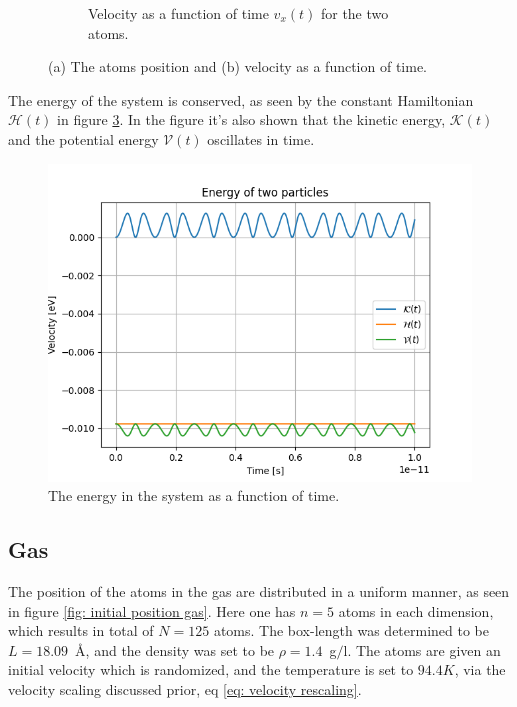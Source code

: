 \documentclass[a4paper]{article}
\begin{document}
\begin{figure}[H]
\begin{subfigure}[b]{0.45\textwidth}
        \caption{Velocity as a function of time $v_x(t)$ for the two atoms.}
        \label{fig: Velocity BT}
    \end{subfigure}
    \caption{(a) The atoms position and (b) velocity as a function of time.}
    \label{fig: Position & Velocity Bouncing test}
\end{figure}\noindent
The energy of the system is conserved, as seen by the constant Hamiltonian $\mathcal{H}(t)$ in figure \ref{fig: Energy Bouncing test}.
In the figure it's also shown that the kinetic energy, $\mathcal{K}(t)$ and the potential energy $\mathcal{V}(t)$ oscillates in time.
\begin{figure}[H]
    \centering
    \includegraphics[scale = 0.5]{bsE.png}
    \caption{The energy in the system as a function of time.}
    \label{fig: Energy Bouncing test}
\end{figure}

\subsection{Gas}\label{sec: Gas}
The position of the atoms in the gas are distributed in a uniform manner, as seen in figure \ref{fig: initial position gas}. Here one has $n = 5$ atoms in each dimension, which results in total of $N = 125$ atoms. 
The box-length was determined to be $L = 18.09$~Å, and the density was set to be $\rho = 1.4$~g$/$l.
The atoms are given an initial velocity which is randomized, and the temperature is set to $94.4K$, via the velocity scaling discussed prior, eq \eqref{eq: velocity rescaling}.
\end{document}
